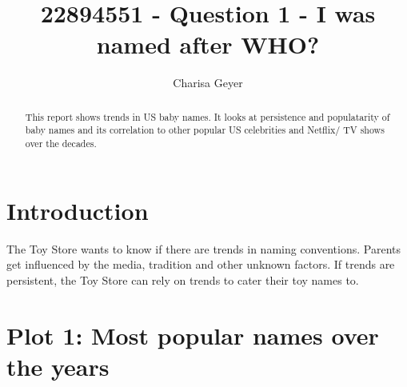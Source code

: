 \documentclass[11pt,preprint]{elsarticle}
\numberwithin{equation}{section}
\numberwithin{figure}{section}
\numberwithin{table}{section}
\begin{document}
\begin{frontmatter}  %

\title{22894551 - Question 1 - I was named after WHO?}





\author[Add1]{Charisa Geyer}





\address[Add1]{Stellenbosch University, Cape Town, South Africa}


\begin{abstract}
\small{
This report shows trends in US baby names. It looks at persistence and
populatarity of baby names and its correlation to other popular US
celebrities and Netflix/ TV shows over the decades.
}
\end{abstract}

\vspace{1cm}





\vspace{0.5cm}

\end{frontmatter}

\setcounter{footnote}{0}



\pagestyle{fancy}
\chead{}
\rhead{}
\lfoot{}
\lhead{}
\cfoot{}


\headsep 35pt %




\section{\texorpdfstring{Introduction
\label{Introduction}}{Introduction }}\label{introduction}

The Toy Store wants to know if there are trends in naming conventions.
Parents get influenced by the media, tradition and other unknown
factors. If trends are persistent, the Toy Store can rely on trends to
cater their toy names to. \newpage

\section{Plot 1: Most popular names over the
years}\label{plot-1-most-popular-names-over-the-years}
\end{document}

